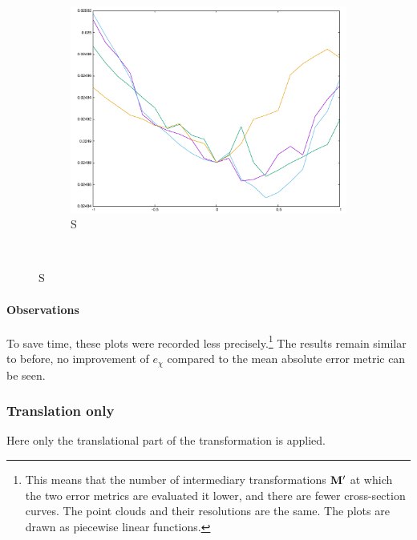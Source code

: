 \begin{figure}[H]
\begin{subfigure}{.33\textwidth}
	\includegraphics[width=\linewidth]{fig/ajherr/t3/S_mae.pdf}
	\caption{S}
\end{subfigure}\\
\end{figure}


\paragraph{Observations} To save time, these plots were recorded less precisely.\footnote{This means that the number of intermediary transformations $\mathbf{M'}$ at which the two error metrics are evaluated it lower, and there are fewer cross-section curves. The point clouds and their resolutions are the same. The plots are drawn as piecewise linear functions.} The results remain similar to before, no improvement of $e_{\chi}$ compared to the mean absolute error metric can be seen. 


\subsubsection{Translation only}
Here only the translational part of the transformation is applied.

